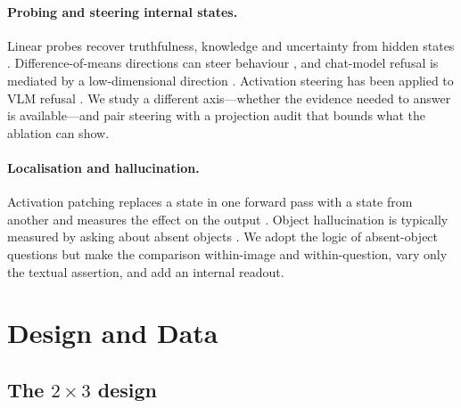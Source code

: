 \documentclass[10pt]{article}
\begin{document}
\paragraph{Probing and steering internal states.}
Linear probes recover truthfulness, knowledge and uncertainty from hidden states \citep{alain2016understanding,azaria2023internal,burns2023discovering,kadavath2022language,marks2024geometry}. Difference-of-means directions can steer behaviour \citep{turner2023activation,rimsky2024steering,zou2023representation,li2023inference}, and chat-model refusal is mediated by a low-dimensional direction \citep{arditi2024refusal,joad2026more}. Activation steering has been applied to VLM refusal \citep{yang2026steering}. We study a different axis---whether the evidence needed to answer is available---and pair steering with a projection audit that bounds what the ablation can show.

\paragraph{Localisation and hallucination.}
Activation patching replaces a state in one forward pass with a state from another and measures the effect on the output \citep{meng2022locating}. Object hallucination is typically measured by asking about absent objects \citep{rohrbach2018object,li2023pope}. We adopt the logic of absent-object questions but make the comparison within-image and within-question, vary only the textual assertion, and add an internal readout.

\section{Design and Data}

\subsection{The $2\times3$ design}
\end{document}
